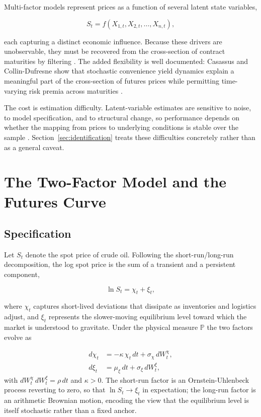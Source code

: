 \documentclass[journal]{IEEEtran}
\begin{document}
Multi-factor models represent prices as a function of several latent state variables,

\begin{equation}
  S_t = f(X_{1,t}, X_{2,t}, \dots, X_{n,t}) ,
\end{equation}

each capturing a distinct economic influence. Because these drivers are unobservable, they must be recovered from the cross-section of contract maturities by filtering \cite{SchwartzSmith2000, Peters2011}. The added flexibility is well documented: Casassus and Collin-Dufresne show that stochastic convenience yield dynamics explain a meaningful part of the cross-section of futures prices while permitting time-varying risk premia across maturities \cite{CasassusCollinDufresne2005, HamiltonWu2014}.

The cost is estimation difficulty. Latent-variable estimates are sensitive to noise, to model specification, and to structural change, so performance depends on whether the mapping from prices to underlying conditions is stable over the sample \cite{Peters2011, Ballestra2025, SchwartzSmith2000}. Section~\ref{sec:identification} treats these difficulties concretely rather than as a general caveat.

\section{The Two-Factor Model and the Futures Curve}
\label{sec:twofactor}

\subsection{Specification}

Let $S_t$ denote the spot price of crude oil. Following the short-run/long-run decomposition, the log spot price is the sum of a transient and a persistent component,

\begin{equation}
  \ln S_t = \chi_t + \xi_t ,
  \label{eq:decomposition}
\end{equation}

where $\chi_t$ captures short-lived deviations that dissipate as inventories and logistics adjust, and $\xi_t$ represents the slower-moving equilibrium level toward which the market is understood to gravitate. Under the physical measure $\mathbb{P}$ the two factors evolve as

\begin{align}
  d\chi_t &= -\kappa\,\chi_t\,dt + \sigma_\chi\,dW^\chi_t ,
  \label{eq:chi_p} \\[2pt]
  d\xi_t  &= \mu_\xi\,dt + \sigma_\xi\,dW^\xi_t ,
  \label{eq:xi_p}
\end{align}
%
with $dW^\chi_t\,dW^\xi_t = \rho\,dt$ and $\kappa > 0$. The short-run factor is an Ornstein-Uhlenbeck process reverting to zero, so that $\ln S_t \to \xi_t$ in expectation; the long-run factor is an arithmetic Brownian motion, encoding the view that the equilibrium level is itself stochastic rather than a fixed anchor.
\end{document}
